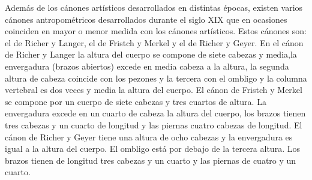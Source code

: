 \documentclass[a4paper,12pt]{article} %
\begin{document}
Además de los cánones artísticos desarrollados en distintas épocas, existen varios cánones antropométricos desarrollados durante el siglo XIX que en ocasiones coinciden en mayor o menor medida con los cánones artísticos.
Estos cánones son: el de Richer y Langer, el de Fristch y Merkel y el de Richer y Geyer.
En el cánon de Richer y Langer la altura del cuerpo se compone de siete cabezas y media,la envergadura (brazos abiertos) excede en media cabeza a la altura, la segunda altura de cabeza coincide con los pezones y la tercera con el ombligo y la columna vertebral es dos veces y media la altura del cuerpo.
El cánon de Fristch y Merkel se compone por un cuerpo de siete cabezas y tres cuartos de altura. La envergadura excede en un cuarto de cabeza la altura del cuerpo, los brazos tienen tres cabezas y un cuarto de longitud y las piernas cuatro cabezas de longitud.
El cánon de Richer y Geyer tiene una altura de ocho cabezas y la envergadura es igual a la altura del cuerpo. El ombligo está por debajo de la tercera altura. Los brazos tienen de longitud tres cabezas y un cuarto y las piernas de cuatro y un cuarto.

\vspace{12pt} %
\end{document}
